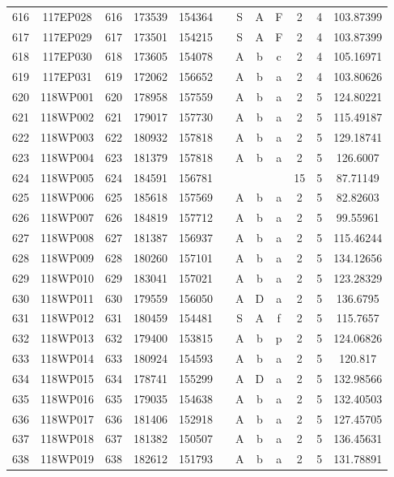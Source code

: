 \begin{tabular}{|*{12}{c|}}
616 & 117EP028 & 616 & 173539 & 154364 &  & S & A & F & 2 & 4 & 103.87399 \\ 
617 & 117EP029 & 617 & 173501 & 154215 &  & S & A & F & 2 & 4 & 103.87399 \\ 
618 & 117EP030 & 618 & 173605 & 154078 &  & A & b & c & 2 & 4 & 105.16971 \\ 
619 & 117EP031 & 619 & 172062 & 156652 &  & A & b & a & 2 & 4 & 103.80626 \\ 
620 & 118WP001 & 620 & 178958 & 157559 &  & A & b & a & 2 & 5 & 124.80221 \\ 
621 & 118WP002 & 621 & 179017 & 157730 &  & A & b & a & 2 & 5 & 115.49187 \\ 
622 & 118WP003 & 622 & 180932 & 157818 &  & A & b & a & 2 & 5 & 129.18741 \\ 
623 & 118WP004 & 623 & 181379 & 157818 &  & A & b & a & 2 & 5 & 126.6007 \\ 
624 & 118WP005 & 624 & 184591 & 156781 &  &  &  &  & 15 & 5 & 87.71149 \\ 
625 & 118WP006 & 625 & 185618 & 157569 &  & A & b & a & 2 & 5 & 82.82603 \\ 
626 & 118WP007 & 626 & 184819 & 157712 &  & A & b & a & 2 & 5 & 99.55961 \\ 
627 & 118WP008 & 627 & 181387 & 156937 &  & A & b & a & 2 & 5 & 115.46244 \\ 
628 & 118WP009 & 628 & 180260 & 157101 &  & A & b & a & 2 & 5 & 134.12656 \\ 
629 & 118WP010 & 629 & 183041 & 157021 &  & A & b & a & 2 & 5 & 123.28329 \\ 
630 & 118WP011 & 630 & 179559 & 156050 &  & A & D & a & 2 & 5 & 136.6795 \\ 
631 & 118WP012 & 631 & 180459 & 154481 &  & S & A & f & 2 & 5 & 115.7657 \\ 
632 & 118WP013 & 632 & 179400 & 153815 &  & A & b & p & 2 & 5 & 124.06826 \\ 
633 & 118WP014 & 633 & 180924 & 154593 &  & A & b & a & 2 & 5 & 120.817 \\ 
634 & 118WP015 & 634 & 178741 & 155299 &  & A & D & a & 2 & 5 & 132.98566 \\ 
635 & 118WP016 & 635 & 179035 & 154638 &  & A & b & a & 2 & 5 & 132.40503 \\ 
636 & 118WP017 & 636 & 181406 & 152918 &  & A & b & a & 2 & 5 & 127.45705 \\ 
637 & 118WP018 & 637 & 181382 & 150507 &  & A & b & a & 2 & 5 & 136.45631 \\ 
638 & 118WP019 & 638 & 182612 & 151793 &  & A & b & a & 2 & 5 & 131.78891 \\ 

\end{tabular}
